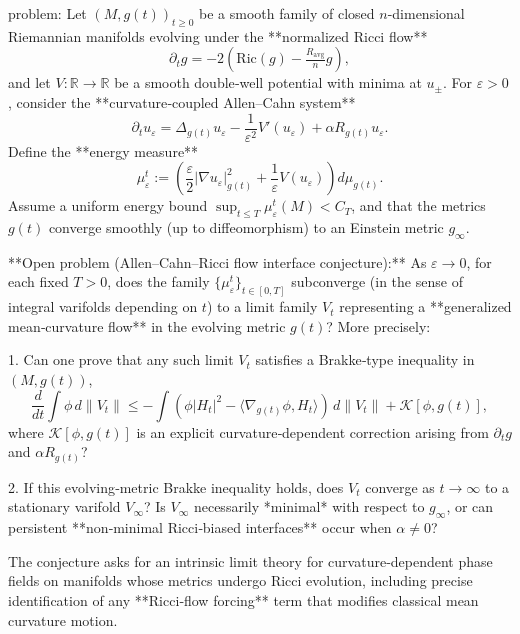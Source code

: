 problem:  
Let \((M,g(t))_{t\ge0}\) be a smooth family of closed \(n\)-dimensional Riemannian manifolds evolving under the **normalized Ricci flow**
\[
\partial_t g = -2(\mathrm{Ric}(g) - \tfrac{R_\mathrm{avg}}{n} g), 
\]
and let \(V:\mathbb{R}\to\mathbb{R}\) be a smooth double‑well potential with minima at \(u_\pm\).  
For \(\varepsilon>0\), consider the **curvature‑coupled Allen–Cahn system**
\[
\partial_t u_\varepsilon = \Delta_{g(t)}u_\varepsilon - \frac{1}{\varepsilon^2}V'(u_\varepsilon) + \alpha R_{g(t)}u_\varepsilon.
\]
Define the **energy measure**
\[
\mu^t_\varepsilon := \left(\frac{\varepsilon}{2}|\nabla u_\varepsilon|_{g(t)}^2 + \frac{1}{\varepsilon}V(u_\varepsilon)\right)\!d\mu_{g(t)}.
\]
Assume a uniform energy bound \(\sup_{t\le T}\mu^t_\varepsilon(M)<C_T\), and that the metrics \(g(t)\) converge smoothly (up to diffeomorphism) to an Einstein metric \(g_\infty\).

**Open problem (Allen–Cahn–Ricci flow interface conjecture):**  
As \(\varepsilon\to0\), for each fixed \(T>0\), does the family \(\{\mu^t_\varepsilon\}_{t\in[0,T]}\) subconverge (in the sense of integral varifolds depending on \(t\)) to a limit family \(V_t\) representing a **generalized mean‑curvature flow** in the evolving metric \(g(t)\)?  
More precisely:

1. Can one prove that any such limit \(V_t\) satisfies a Brakke‑type inequality in \((M,g(t))\),
   \[
   \frac{d}{dt}\!\int\!\phi\, d\|V_t\| 
   \le -\!\int (\phi |H_t|^2 - \langle\nabla_{g(t)}\phi, H_t\rangle)\,d\|V_t\|
   +\mathcal{K}[\phi,g(t)], 
   \]
   where \(\mathcal{K}[\phi,g(t)]\) is an explicit curvature‑dependent correction arising from \(\partial_t g\) and \(\alpha R_{g(t)}\)?  

2. If this evolving‑metric Brakke inequality holds, does \(V_t\) converge as \(t\to\infty\) to a stationary varifold \(V_\infty\)?  Is \(V_\infty\) necessarily *minimal* with respect to \(g_\infty\), or can persistent **non‑minimal Ricci‑biased interfaces** occur when \(\alpha\neq0\)?  

The conjecture asks for an intrinsic limit theory for curvature‑dependent phase fields on manifolds whose metrics undergo Ricci evolution, including precise identification of any **Ricci‑flow forcing** term that modifies classical mean curvature motion.

